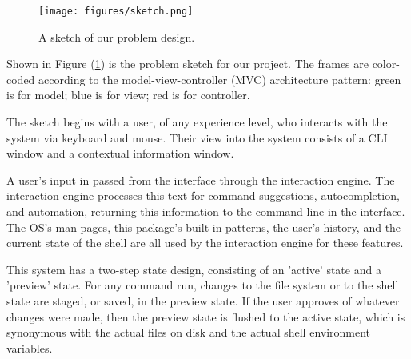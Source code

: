 \begin{figure}[h]
  \centering
  \texttt{[image: figures/sketch.png]}
  \caption{A sketch of our problem design.}
  \label{fig:sketch}
\end{figure}

Shown in Figure (\ref{fig:sketch}) is the problem sketch for our project. The
frames are color-coded according to the model-view-controller (MVC) architecture
pattern: green is for model; blue is for view; red is for controller.

The sketch begins with a user, of any experience level, who interacts with the
system via keyboard and mouse. Their view into the system consists of a CLI
window and a contextual information window.

A user's input in passed from the interface through the interaction engine. The
interaction engine processes this text for command suggestions, autocompletion,
and automation, returning this information to the command line in the interface.
The OS's man pages, this package's built-in patterns, the user's history, and
the current state of the shell are all used by the interaction engine for these
features.

This system has a two-step state design, consisting of an 'active' state and a
'preview' state. For any command run, changes to the file system or to the shell
state are staged, or saved, in the preview state. If the user approves of
whatever changes were made, then the preview state is flushed to the active
state, which is synonymous with the actual files on disk and the actual shell
environment variables.

